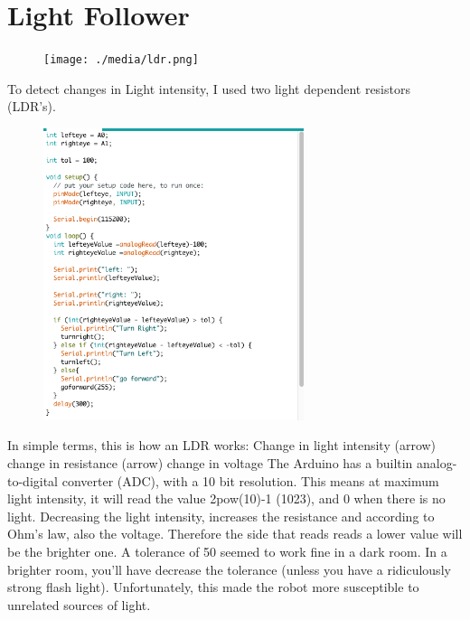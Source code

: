 \documentclass[final,3p,times]{article}
\begin{document}
\section{Light Follower}
\begin{figure}[h!]
\texttt{[image: ./media/ldr.png]}
\end{figure}
To detect changes in Light intensity, I used two light dependent resistors (LDR's).
\newpage
\begin{figure}
\includegraphics[trim={0cm 0cm 0cm 0cm}, clip, width=3in]{./media/lightFollower.jpg}
\end{figure}
In simple terms, this is how an LDR works:
Change in light intensity (arrow) change in resistance (arrow) change in voltage
The Arduino has a builtin analog-to-digital converter (ADC), with a 10 bit resolution.
This means at maximum light intensity, it will read the value 2pow(10)-1 (1023), and 0 when there is no light.
Decreasing the light intensity, increases the resistance and according to Ohm's law, also the voltage.
Therefore the side that reads reads a lower value will be the brighter one.
A tolerance of 50 seemed to work fine in a dark room. In a brighter room, you'll have decrease the tolerance (unless you have a ridiculously strong flash light).
Unfortunately, this made the robot more susceptible to unrelated sources of light. 
\end{document}
